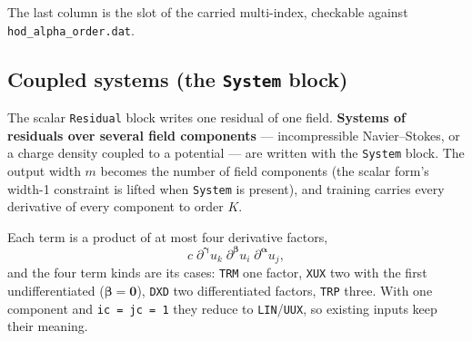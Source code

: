 \documentclass[10pt,a4paper]{article}
\newcommand{\code}[1]{\texttt{#1}}
\newcommand{\mi}[1]{\boldsymbol{#1}}
\begin{document}
The last column is the slot of the carried multi-index, checkable
against \code{hod\_alpha\_order.dat}.

\subsection{Coupled systems (the \code{System} block)}
\label{sec:system}

The scalar \code{Residual} block writes one residual of one field.
\textbf{Systems of residuals over several field components} ---
incompressible Navier--Stokes, or a charge density coupled to a
potential --- are written with the \code{System} block. The output
width $m$ becomes the number of field components (the scalar form's
width-1 constraint is lifted when \code{System} is present), and
training carries every derivative of every component to order $K$.

Each term is a product of at most four derivative factors,
\[
  c\;\partial^{\mi\gamma}u_{k}\;\partial^{\mi\beta}u_{i}\;\partial^{\mi\alpha}u_{j},
\]
and the four term kinds are its cases: \code{TRM} one factor,
\code{XUX} two with the first undifferentiated ($\mi\beta=\mi0$),
\code{DXD} two differentiated factors, \code{TRP} three. With one
component and \code{ic = jc = 1} they reduce to \code{LIN}/\code{UUX},
so existing inputs keep their meaning.
\end{document}
